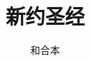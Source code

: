 \documentclass[12pt,oneside]{book}
\begin{document}
\title{新约圣经}
\author{和合本}

\makemytitleA
\end{document}
